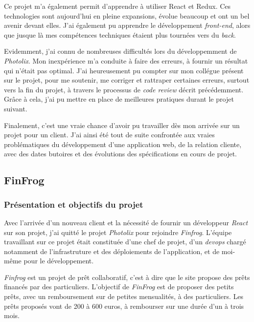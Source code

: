 \documentclass[12pt,a4paper]{article}
\begin{document}
  \bigskip

  Ce projet m'a également permit d'apprendre à utiliser React et Redux.
  Ces technologies sont aujourd'hui en pleine expansions, évolue beaucoup
  et ont un bel avenir devant elles. J'ai également pu apprendre le
  développement \emph{front-end}, alors que jusque là mes compétences
  techniques étaient plus tournées vers du \emph{back}.

  \bigskip

  Evidemment, j'ai connu de nombreuses difficultés lors du développemment
  de \emph{Photolix}. Mon inexpérience m'a conduite à faire des erreurs, à
  fournir un résultat qui n'était pas optimal. J'ai heureusement pu
  compter sur mon collégue présent sur le projet, pour me soutenir, me
  corriger et rattraper certaines erreurs, surtout vers la fin du projet,
  à travers le processus de \emph{code review} décrit précédemment. Grâce
  à cela, j'ai pu mettre en place de meilleures pratiques durant le projet
  suivant.

  \bigskip

  Finalement, c'est une vraie chance d'avoir pu travailler dès mon arrivée
  sur un projet pour un client. J'ai ainsi été tout de suite confrontée
  aux vraies problématiques du développement d'une application web, de la
  relation cliente, avec des dates butoires et des évolutions des
  spécifications en cours de projet.

  \subsection{FinFrog}\label{finfrog}

  \subsubsection{Présentation et objectifs du
  projet}\label{pruxe9sentation-et-objectifs-du-projet-1}

  \bigskip

  Avec l'arrivée d'un nouveau client et la nécessité de fournir un
  développeur \emph{React} sur son projet, j'ai quitté le projet
  \emph{Photolix} pour rejoindre \emph{Finfrog}. L'équipe travaillant sur
  ce projet était constituée d'une chef de projet, d'un \emph{devops}
  chargé notamment de l'infrastruture et des déploiements de
  l'application, et de moi-même pour le développement.

  \bigskip

  \emph{Finfrog} est un projet de prêt collaboratif, c'est à dire que le
  site propose des prêts financés par des particuliers. L'objectif de
  \emph{FinFrog} est de proposer des petits prêts, avec un remboursement
  sur de petites mensualités, à des particuliers. Les prêts proposés vont
  de 200 à 600 euros, à rembourser sur une durée d'un à trois mois.
\end{document}
